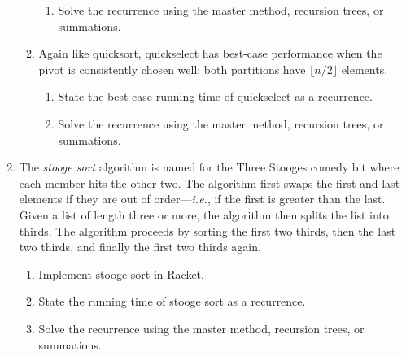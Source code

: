 \documentclass{article}
\begin{document}
\begin{enumerate}
\begin{enumerate}
\begin{enumerate}
    \item Solve the recurrence using the master method, recursion trees, or
      summations.
    \end{enumerate}
  \item
    Again like quicksort, quickselect has best-case performance when the pivot
    is consistently chosen well: both partitions have \(\lfloor{n/2}\rfloor\)
    elements.
    \begin{enumerate}
    \item State the best-case running time of quickselect as a recurrence.
    \item Solve the recurrence using the master method, recursion trees, or
      summations.
    \end{enumerate}
  \end{enumerate}

  \pagebreak[2]
\item
  The \emph{stooge sort} algorithm is named for the Three Stooges comedy bit
  where each member hits the other two.  The algorithm first swaps the first and
  last elements if they are out of order---\emph{i.e.}, if the first is greater
  than the last.  Given a list of length three or more, the algorithm then
  splits the list into thirds.  The algorithm proceeds by sorting the first two
  thirds, then the last two thirds, and finally the first two thirds again.
  \begin{enumerate}
  \item Implement stooge sort in Racket.
  \item State the running time of stooge sort as a recurrence.
  \item Solve the recurrence using the master method, recursion trees, or
    summations.
  \end{enumerate}


\end{enumerate}
\end{document}
